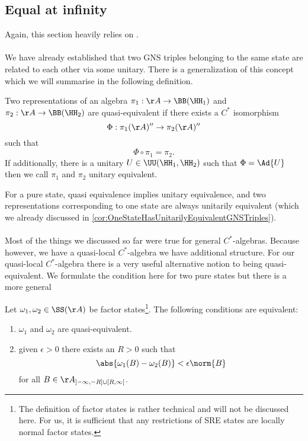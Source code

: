 \subsection{Equal at infinity}\label{sec:equal-at-infinity}
Again, this section heavily relies on \cite{BratRob}.\\\\
We have already established that two GNS triples belonging to the same state are related to each other via some unitary. There is a generalization of this concept which we will summarise in the following definition.
\begin{definition}
	Two representations of an algebra $\pi_1:\AA\rightarrow\BB(\HH_1)$ and $\pi_2:\AA\rightarrow\BB(\HH_2)$ are quasi-equivalent if there exists a $C^*$ isomorphism
	\begin{equation}
	\Phi:\pi_1(\AA)''\rightarrow\pi_2(\AA)''
	\end{equation}
	such that
	\begin{equation}
	\Phi\circ\pi_1=\pi_2.
	\end{equation}
	If additionally, there is a unitary $U\in\UU(\HH_1,\HH_2)$ such that $\Phi=\Ad{U}$ then we call $\pi_1$ and $\pi_2$ unitary equivalent.
\end{definition}
For a pure state, quasi equivalence implies unitary equivalence, and two representations corresponding to one state are always unitarily equivalent (which we already discussed in \ref{cor:OneStateHasUnitarilyEquivalentGNSTriples}).\\\\
Most of the things we discussed so far were true for general $C^*$-algebras. Because however, we have a quasi-local $C^*$-algebra we have additional structure. For our quasi-local $C^*$-algebra there is a very useful alternative notion to being quasi-equivalent. We formulate the condition here for two pure states but there is a more general
\begin{lemma}
	Let $\omega_1,\omega_2\in\SS(\AA)$ be factor states\footnote{The definition of factor states is rather technical and will not be discussed here. For us, it is sufficient that any restrictions of SRE states are locally normal factor states.}. The following conditions are equivalent:
	\begin{enumerate}
		\item $\omega_1$ and $\omega_2$ are quasi-equivalent.
		\item given $\epsilon>0$ there exists an $R>0$ such that
		\begin{equation}
		\abs{\omega_1(B)-\omega_2(B)}<\epsilon\norm{B}
		\end{equation}
		for all $B\in\AA_{]-\infty,-R]\cup [R,\infty[}$.
	\end{enumerate}
\end{lemma}

